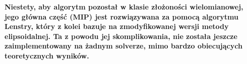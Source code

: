 \textbf{Niestety, aby algorytm pozostał w klasie złożoności wielomianowej, jego główna część (MIP) jest rozwiązywana za pomocą algorytmu Lenstry, który z kolei bazuje na zmodyfikowanej wersji metody elipsoidalnej. Ta z powodu jej skomplikowania, nie została jeszcze zaimplementowany na żadnym solverze, mimo bardzo obiecujących teoretycznych wyników.}


